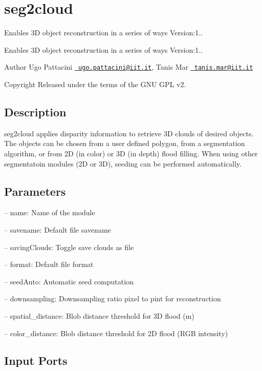 \section{seg2cloud}
\label{group__seg2cloud}


Enables 3D object reconstruction in a series of ways Version\+:1..  


Enables 3D object reconstruction in a series of ways Version\+:1.. 

\begin{DoxyAuthor}{Author}
Ugo Pattacini \href{mailto:ugo.pattacini@iit.it}{\texttt{ ugo.\+pattacini@iit.\+it}}, Tanis Mar \href{mailto:tanis.mar@iit.it}{\texttt{ tanis.\+mar@iit.\+it}} ~\newline
 
\end{DoxyAuthor}
\begin{DoxyCopyright}{Copyright}
Released under the terms of the G\+NU G\+PL v2. 
\end{DoxyCopyright}
\hypertarget{group__seg2cloud_intro_sec}{}\subsection{Description}\label{group__seg2cloud_intro_sec}
seg2cloud applies disparity information to retrieve 3D clouds of desired objects. The objects can be chosen from a user defined polygon, from a segmentation algorithm, or from 2D (in color) or 3D (in depth) flood filling. When using other segmentatoin modules (2D or 3D), seeding can be performed automatically.\hypertarget{group__seg2cloud_parameters_sec}{}\subsection{Parameters}\label{group__seg2cloud_parameters_sec}

\begin{DoxyItemize}
\item -- name\+: Name of the module
\item -- savename\+: Default file savename
\item -- saving\+Clouds\+: Toggle save clouds as file
\item -- format\+: Default file format
\item -- seed\+Auto\+: Automatic seed computation
\item -- downsampling\+: Downsampling ratio pixel to pint for reconstruction
\item -- spatial\+\_\+distance\+: Blob distance threshold for 3D flood (m)
\item -- color\+\_\+distance\+: Blob distance threshold for 2D flood (R\+GB intensity) 
\end{DoxyItemize}\hypertarget{group__seg2cloud_inputports_sec}{}\subsection{Input Ports}\label{group__seg2cloud_inputports_sec}

